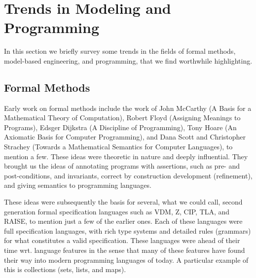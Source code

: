 

\section{Trends in Modeling and Programming}
\label{sec:trends}

In this section we briefly survey some trends in the fields of
formal methods, model-based engineering, and programming, that we find worthwhile highlighting.


\subsection{Formal Methods}

Early work on formal methods include the work of John McCarthy 
(A Basis for a Mathematical Theory of Computation), Robert Floyd (Assigning Meanings to Programs), Edsger 
Dijkstra (A Discipline of Programming), Tony Hoare (An Axiomatic 
Basis for Computer Programming), and Dana Scott and Christopher 
Strachey (Towards a Mathematical Semantics for Computer Languages), 
to mention a few. These ideas were theoretic in nature and deeply 
influential. They brought us the ideas of  annotating programs with 
assertions, such as pre- and post-conditions, and invariants, 
correct by construction development (refinement), and giving 
semantics to programming languages. 

These ideas were subsequently the basis for several, what we could 
call, second generation formal specification languages such as 
VDM, Z, CIP, TLA, and RAISE, to mention just a few of the earlier ones. Each of these languages were full 
specification languages, with rich type systems and detailed rules 
(grammars) for what constitutes a valid specification. These 
languages were ahead of their time wrt. language features in the 
sense that many of these features have found their 
way into modern programming languages of today. A particular
example of this is collections (sets, lists, and maps).

